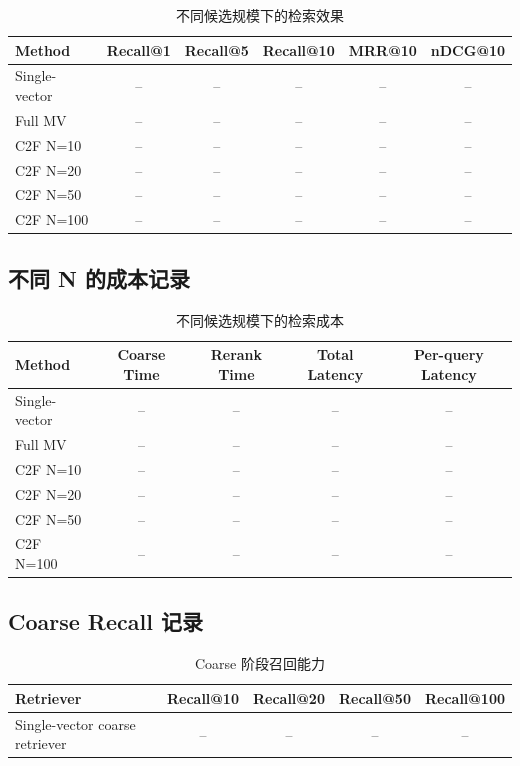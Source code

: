 \documentclass[UTF8,a4paper,12pt]{ctexart}
\begin{document}
	\begin{table}[H]
		\centering
		\caption{不同候选规模下的检索效果}
		\begin{tabular}{lccccc}
			\toprule
			\textbf{Method} & \textbf{Recall@1} & \textbf{Recall@5} & \textbf{Recall@10} & \textbf{MRR@10} & \textbf{nDCG@10} \\
			\midrule
			Single-vector & -- & -- & -- & -- & -- \\
			Full MV & -- & -- & -- & -- & -- \\
			C2F N=10 & -- & -- & -- & -- & -- \\
			C2F N=20 & -- & -- & -- & -- & -- \\
			C2F N=50 & -- & -- & -- & -- & -- \\
			C2F N=100 & -- & -- & -- & -- & -- \\
			\bottomrule
		\end{tabular}
	\end{table}
	
	\subsection{不同 N 的成本记录}
	
	\begin{table}[H]
		\centering
		\caption{不同候选规模下的检索成本}
		\begin{tabular}{lcccc}
			\toprule
			\textbf{Method} & \textbf{Coarse Time} & \textbf{Rerank Time} & \textbf{Total Latency} & \textbf{Per-query Latency} \\
			\midrule
			Single-vector & -- & -- & -- & -- \\
			Full MV & -- & -- & -- & -- \\
			C2F N=10 & -- & -- & -- & -- \\
			C2F N=20 & -- & -- & -- & -- \\
			C2F N=50 & -- & -- & -- & -- \\
			C2F N=100 & -- & -- & -- & -- \\
			\bottomrule
		\end{tabular}
	\end{table}
	
	\subsection{Coarse Recall 记录}
	
	\begin{table}[H]
		\centering
		\caption{Coarse 阶段召回能力}
		\begin{tabular}{lcccc}
			\toprule
			\textbf{Retriever} & \textbf{Recall@10} & \textbf{Recall@20} & \textbf{Recall@50} & \textbf{Recall@100} \\
			\midrule
			Single-vector coarse retriever & -- & -- & -- & -- \\
			\bottomrule
		\end{tabular}
	\end{table}
	
\end{document}
